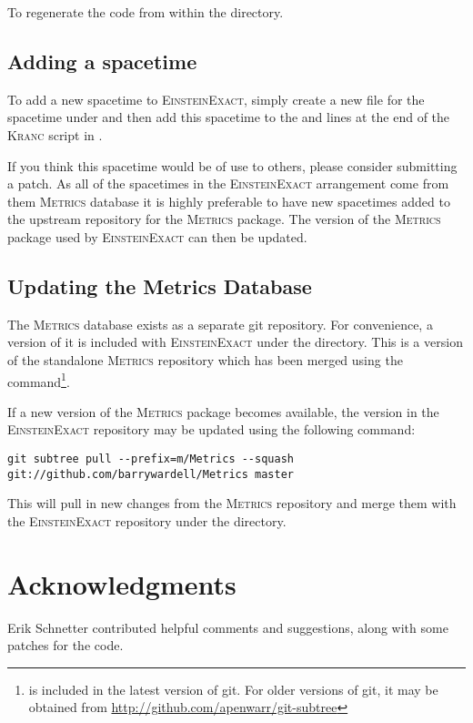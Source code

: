 \documentclass{article}
\begin{document}
To regenerate the code  from within the  directory.

\subsection{Adding a spacetime}
To add a new spacetime to \textsc{EinsteinExact}, simply create a new file
for the spacetime under  and then add this spacetime
to the  and  lines at the end
of the \textsc{Kranc} script in .

If you think this spacetime would be of use to others, please consider 
submitting a patch. As all of the spacetimes in the \textsc{EinsteinExact}
arrangement come from them \textsc{Metrics} database it is highly preferable to
have new spacetimes added to the upstream repository for the \textsc{Metrics}
package. The version of the \textsc{Metrics} package used by
\textsc{EinsteinExact} can then be updated.

\subsection{Updating the Metrics Database}
The \textsc{Metrics} database exists as a separate git repository. For
convenience, a version of it is included with \textsc{EinsteinExact} under
the  directory. This is a version of the standalone
\textsc{Metrics} repository which has been merged using the 
command\footnote{ is included in the latest version of git.
For older versions of git, it may be obtained from
\url{http://github.com/apenwarr/git-subtree}}.

If a new version of the \textsc{Metrics} package becomes available, the version
in the \textsc{EinsteinExact} repository may be updated using the following
command:
\begin{verbatim}
git subtree pull --prefix=m/Metrics --squash git://github.com/barrywardell/Metrics master
\end{verbatim}
This will pull in new changes from the \textsc{Metrics} repository and merge
them with the \textsc{EinsteinExact} repository under the 
directory.

\section{Acknowledgments}
Erik Schnetter contributed helpful comments and suggestions, along with some
patches for the code.

\end{document}
